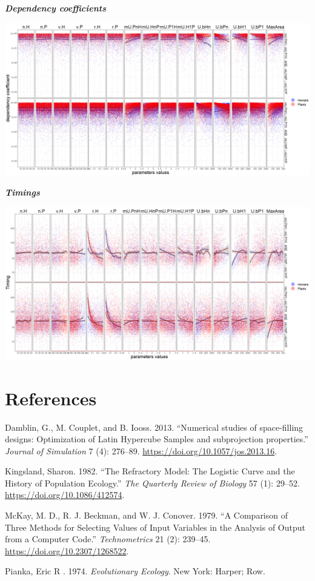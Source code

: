 \documentclass[
]{book}
\newlength{\cslhangindent}
\newenvironment{cslreferences}%
  {\setlength{\parindent}{0pt}%
  \everypar{\setlength{\hangindent}{\cslhangindent}}\ignorespaces}%
  {\par}
\begin{document}
\textbf{\emph{Dependency coefficients}}

\includegraphics[width=1\linewidth]{plots/5_multiplePar-depend-bothLessBase-ggplot}

\textbf{\emph{Timings}}

\includegraphics[width=1\linewidth]{plots/5_multiplePar-timing-bothLessBase-ggplot}

\hypertarget{references}{%
\chapter{References}\label{references}}

\hypertarget{refs}{}
\begin{cslreferences}
\leavevmode\hypertarget{ref-Damblin2013}{}%
Damblin, G., M. Couplet, and B. Iooss. 2013. ``Numerical studies of space-filling designs: Optimization of Latin Hypercube Samples and subprojection properties.'' \emph{Journal of Simulation} 7 (4): 276--89. \url{https://doi.org/10.1057/jos.2013.16}.

\leavevmode\hypertarget{ref-Kingsland1982}{}%
Kingsland, Sharon. 1982. ``The Refractory Model: The Logistic Curve and the History of Population Ecology.'' \emph{The Quarterly Review of Biology} 57 (1): 29--52. \url{https://doi.org/10.1086/412574}.

\leavevmode\hypertarget{ref-McKay1979a}{}%
McKay, M. D., R. J. Beckman, and W. J. Conover. 1979. ``A Comparison of Three Methods for Selecting Values of Input Variables in the Analysis of Output from a Computer Code.'' \emph{Technometrics} 21 (2): 239--45. \url{https://doi.org/10.2307/1268522}.

\leavevmode\hypertarget{ref-Pianka1974}{}%
Pianka, Eric R . 1974. \emph{Evolutionary Ecology}. New York: Harper; Row.
\end{cslreferences}
\end{document}
